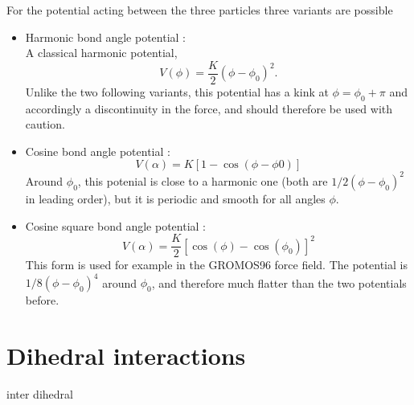 For the potential acting between the three particles three variants are possible
\begin{itemize}
\item Harmonic bond angle potential :\\
  A classical harmonic potential,
  \begin{equation}
    V(\phi) = \frac{K}{2} \left(\phi - \phi_0\right)^2.
  \end{equation}
  Unlike the two following variants, this potential has a kink at
  $\phi=\phi_0+\pi$ and accordingly a discontinuity in the force, and should
  therefore be used with caution.
\item Cosine bond angle potential :\\
  \begin{equation}
    V(\alpha) = K \left[1 - \cos(\phi - \phi0)\right]
  \end{equation}
  Around $\phi_0$, this potenial is close to a harmonic one (both are
  $1/2(\phi-\phi_0)^2$ in leading order), but it is periodic and smooth for all
  angles $\phi$.
\item Cosine square bond angle potential :\\
  \begin{equation}
    V(\alpha) = \frac{K}{2} \left[\cos(\phi) - \cos(\phi_0)\right]^2
  \end{equation}
  This form is used for example in the GROMOS96 force field. The potential is
  $1/8(\phi-\phi_0)^4$ around $\phi_0$, and therefore much flatter than the
  two potentials before.
\end{itemize}

\section{Dihedral interactions}
\label{sec:dihedral}

\begin{essyntax}
  inter  dihedral   
\end{essyntax}

